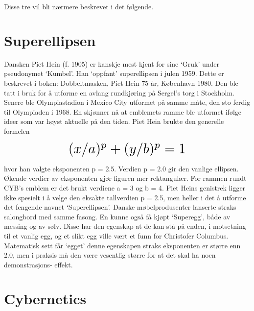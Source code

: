 Disse tre vil bli nærmere beskrevet i det følgende.


\section{Superellipsen}

Dansken Piet Hein (f. 1905) er kanskje mest kjent for sine `Gruk' under pseudonymet `Kumbel'. Han `oppfant' superellipsen i julen 1959. Dette er beskrevet i boken: Dobbeltmasken, Piet Hein 75 år, København 1980. Den ble tatt i bruk for å utforme en avlang rundkjøring på Sergel's torg i Stockholm. Senere ble Olympiastadion i Mexico City utformet på samme måte, den sto ferdig til Olympiaden i 1968. En skjønner nå at emblemets ramme ble utformet ifølge ideer som var høyst aktuelle på den tiden. Piet Hein brukte den generelle formelen

\[ \scalebox{2}{$(x / a)^p + (y / b)^p = 1$} \]

hvor han valgte eksponenten p = 2.5. Verdien p = 2.0 gir den vanlige ellipsen. Økende verdier av eksponenten gjør figuren mer rektangulær. For rammen rundt CYB's emblem er det brukt verdiene a = 3 og b = 4. Piet Heins genistrek ligger ikke spesielt i å velge den eksakte tallverdien p = 2.5, men heller i det å utforme det fengende navnet `Superellipsen'. Danske møbelprodusenter lanserte straks salongbord med samme fasong. En kunne også få kjøpt `Superegg', både av messing og av sølv. Disse har den egenskap at de kan stå på enden, i motsetning til et vanlig egg, og et slikt egg ville vært et funn for Christofer Columbus. Matematisk sett får `egget' denne egenskapen straks eksponenten er større enn 2.0, men i praksis må den være vesentlig større for at det skal ha noen demonstrasjons- effekt.

\section{Cybernetics}

